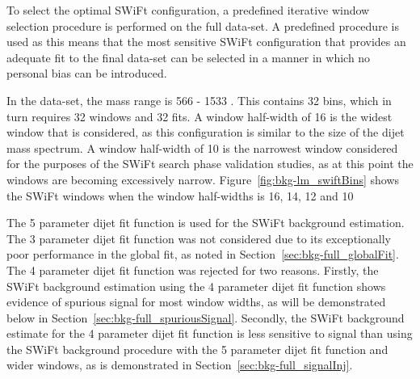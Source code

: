 To select the optimal SWiFt configuration, a predefined iterative window selection procedure is performed on the full \lm{} data-set.
A predefined procedure is used as this means that the most sensitive SWiFt configuration that provides an adequate fit to the final data-set can be selected
in a manner in which no personal bias can be introduced.




In the \lm{} data-set, the mass range is 566 - 1533 \GeV{}. This contains 32 bins, which in turn requires 32 windows and 32 fits.
A window half-width of 16 is  the widest window that is considered,
as this configuration is similar to the size of the dijet mass spectrum.
A window half-width of 10 is the narrowest window considered for the purposes of the SWiFt search phase validation studies,
as at this point the windows are becoming excessively narrow.
Figure~\ref{fig:bkg-lm_swiftBins} shows the SWiFt windows when the window half-widths is 16, 14, 12 and 10

The 5 parameter dijet fit function is used for the SWiFt background estimation.
The 3 parameter dijet fit function was not considered due to its exceptionally poor performance in the global fit, as noted in Section~\ref{sec:bkg-full_globalFit}.
The 4 parameter dijet fit function was rejected for two reasons.
Firstly, the SWiFt background estimation using the 4 parameter dijet fit function shows evidence of spurious signal for most window widths,
as will be demonstrated below in Section~\ref{sec:bkg-full_spuriousSignal}.
Secondly, the SWiFt background estimate for the 4 parameter dijet fit function is less sensitive to signal than
using the SWiFt background procedure with the 5 parameter dijet fit function and wider windows, as is demonstrated in Section~\ref{sec:bkg-full_signalInj}.

